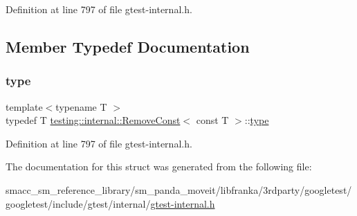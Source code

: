 Definition at line 797 of file gtest-\/internal.\+h.



\subsection{Member Typedef Documentation}
\mbox{\label{structtesting_1_1internal_1_1RemoveConst_3_01const_01T_01_4_ac88c6824d228ab05091e5a4f1c1a95fc}} 
\subsubsection{\texorpdfstring{type}{type}}
{\footnotesize\ttfamily template$<$typename T $>$ \\
typedef T \hyperlink{structtesting_1_1internal_1_1RemoveConst}{testing\+::internal\+::\+Remove\+Const}$<$ const T $>$\+::\hyperlink{structtesting_1_1internal_1_1RemoveConst_3_01const_01T_01_4_ac88c6824d228ab05091e5a4f1c1a95fc}{type}}



Definition at line 797 of file gtest-\/internal.\+h.



The documentation for this struct was generated from the following file\+:\begin{DoxyCompactItemize}
\item 
smacc\+\_\+sm\+\_\+reference\+\_\+library/sm\+\_\+panda\+\_\+moveit/libfranka/3rdparty/googletest/googletest/include/gtest/internal/\hyperlink{gtest-internal_8h}{gtest-\/internal.\+h}\end{DoxyCompactItemize}
